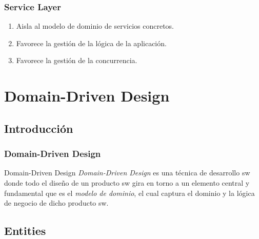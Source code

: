 \documentclass[a4paper,slidestop,xcolor=pst,dvips,blue]{beamer}
\begin{document}
\begin{frame}[c]
    \frametitle{Service Layer}
    \begin{enumerate}
        \item<1-> Aisla al modelo de dominio de servicios concretos.
        \item<2-> Favorece la gestión de la lógica de la aplicación.
        \item<3-> Favorece la gestión de la concurrencia.
    \end{enumerate}
\end{frame}

\section{Domain-Driven Design}

\subsection{Introducción}

\begin{frame}[c]
    \frametitle{Domain-Driven Design}
     \begin{block}{Domain-Driven Design}
     \alert{\emph{Domain-Driven Design}} es una técnica de desarrollo sw donde todo el diseño de un producto sw gira en torno a un elemento central y fundamental que es el \emph{modelo de dominio}, el cual captura el dominio y la lógica de negocio de dicho producto sw.
     \end{block}


\end{frame}

%
\subsection{Entities}
\end{document}
